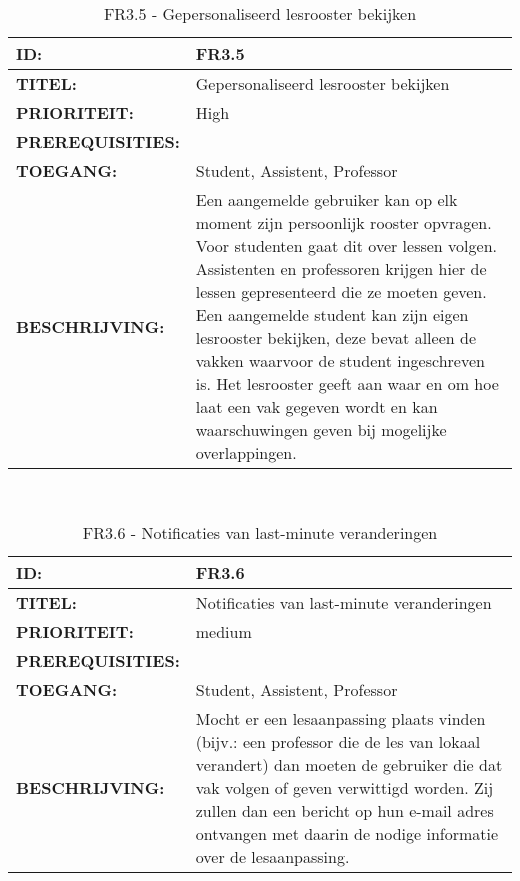 \noindent\begin{table}[H]
            \begin{tabular}{l | p{10cm}}
                \textbf{ID:} & FR3.5 \\ \hline
                \textbf{TITEL:} & Gepersonaliseerd lesrooster bekijken\\ \hline
                \textbf{PRIORITEIT:} &  High \\ \hline
                \textbf{PREREQUISITIES:} & \\ \hline
                \textbf{TOEGANG:} &  Student, Assistent, Professor \\ \hline
                \textbf{BESCHRIJVING:} & Een aangemelde gebruiker kan op elk moment zijn persoonlijk rooster opvragen. Voor studenten gaat dit over lessen volgen. Assistenten en professoren krijgen hier de lessen gepresenteerd die ze moeten geven. Een aangemelde student kan zijn eigen lesrooster bekijken, deze bevat alleen de vakken waarvoor de student ingeschreven is. 
                                        Het lesrooster geeft aan waar en om hoe laat een vak gegeven wordt en kan waarschuwingen geven bij mogelijke overlappingen.\\ 
            \end{tabular}\\
            \caption{FR3.5  - Gepersonaliseerd lesrooster bekijken}
            \label{tab:FR3.5 - Gepersonaliseerd lesrooster bekijken}
        \end{table}

\noindent\begin{table}[H]
            \begin{tabular}{l | p{10cm}}
                \textbf{ID:} & FR3.6 \\ \hline
                \textbf{TITEL:} & Notificaties van last-minute veranderingen \\ \hline
                \textbf{PRIORITEIT:} &  medium \\ \hline
                \textbf{PREREQUISITIES:} & \\ \hline
                \textbf{TOEGANG:} & Student, Assistent, Professor \\ \hline
                \textbf{BESCHRIJVING:} & Mocht er een lesaanpassing plaats vinden (bijv.: een professor die de les van lokaal verandert) dan moeten de gebruiker die dat vak volgen of geven verwittigd worden. Zij zullen dan een bericht op hun e-mail adres ontvangen met daarin de nodige informatie over de lesaanpassing.\\
            \end{tabular}\\
            \caption{FR3.6 - Notificaties van last-minute veranderingen}
			\label{tab:FR3.6 - Notificaties van last-minute veranderingen}
        \end{table}      

